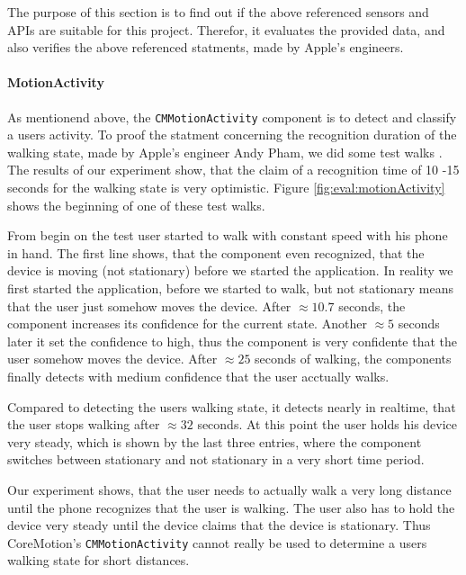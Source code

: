 The purpose of this section is to find out if the above referenced sensors and \acsp{API} are suitable for this project.
Therefor, it evaluates the provided data, and also verifies the above referenced statments, made by Apple's engineers.


\paragraph{MotionActivity}

As mentionend above, the \texttt{CMMotionActivity} component is to detect and classify a users activity.
To proof the statment concerning the recognition duration of the walking state, made by Apple's engineer Andy Pham, we did some test walks \cite{apple:wwdc_2014_pham}.
The results of our experiment show, that the claim of a recognition time of 10 -15 seconds for the walking state is very optimistic.
Figure \ref{fig:eval:motionActivity} shows the beginning of one of these test walks.

From begin on the test user started to walk with constant speed with his phone in hand.
The first line shows, that the component even recognized, that the device is moving (not stationary) before we started the application.
In reality we first started the application, before we started to walk, but not stationary means that the user just somehow moves the device.
After $\approx 10.7$ seconds, the component increases its confidence for the current state.
Another $\approx 5$ seconds later it set the confidence to high, thus the component is very confidente that the user somehow moves the device.
After $\approx 25$ seconds of walking, the components finally detects with medium confidence that the user acctually walks.

Compared to detecting the users walking state, it detects nearly in realtime, that the user stops walking after $\approx 32$ seconds.
At this point the user holds his device very steady, which is shown by the last three entries, where the component switches between stationary and not stationary in a very short time period.

Our experiment shows, that the user needs to actually walk a very long distance until the phone recognizes that the user is walking.
The user also has to hold the device very steady until the device claims that the device is stationary.
Thus CoreMotion's \texttt{CMMotionActivity} cannot really be used to determine a users walking state for short distances.

